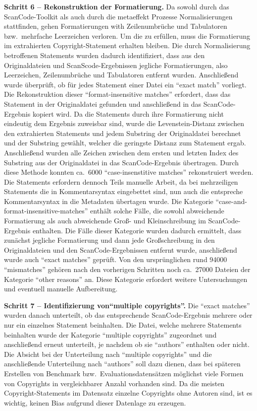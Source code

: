 \textbf{Schritt 6 -- Rekonstruktion der Formatierung.}
Da sowohl durch das ScanCode-Toolkit als auch durch die metaeffekt Prozesse Normalisierungen stattfinden, gehen Formatierungen with Zeilenumbrüche und Tabulatoren bzw.\ mehrfache Leerzeichen verloren.
Um die  zu erfüllen, muss die Formatierung im extrahierten Copyright-Statement erhalten bleiben.
Die durch Normalisierung betroffenen Statements wurden dadurch identifiziert, dass aus den Originaldateien und ScanScode-Ergebnissen jegliche Formatierungen, also Leerzeichen, Zeilenumbrüche und Tabulatoren entfernt wurden.
Anschließend wurde überprüft, ob für jedes Statement einer Datei ein \enquote{exact match} vorliegt.
Die Rekonstruktion dieser \enquote{format-insensitive matches} erfordert, dass das Statement in der Originaldatei gefunden und anschließend in das ScanCode-Ergebnis kopiert wird.
Da die Statements durch ihre Formatierung nicht eindeutig dem Ergebnis zuweisbar sind, wurde die Levenstein-Distanz zwischen den extrahierten Statements und jedem Substring der Originaldatei berechnet und der Substring gewählt, welcher die geringste Distanz zum Statement ergab.
Anschließend wurden alle Zeichen zwischen dem ersten und letzten Index des Substring aus der Originaldatei in das ScanCode-Ergebnis übertragen.
Durch diese Methode konnten ca.\ \num{6000} \enquote{case-insenstitive matches} rekonstruiert werden.
Die Statements erfordern dennoch Teils manuelle Arbeit, da bei mehrzeiligen Statements die in Kommentarsyntax eingebettet sind, nun auch die entspreche Kommentarsyntax in die Metadaten übertagen wurde.
Die Kategorie \enquote{case-and-format-insensitive-matches} enthält solche Fälle, die sowohl abweichende Formatierung als auch abweichende Groß- und Kleinschreibung im ScanCode-Ergebnis enthalten.
Die Fälle dieser Kategorie wurden dadurch ermittelt, dass zunächst jegliche Formatierung und dann jede Großschreibung in den Originaldateien und den ScanCode-Ergebnissen entfernt wurde, anschließend wurde auch \enquote{exact matches} geprüft.
Von den ursprünglichen rund \num{94000} \enquote{mismatches} gehören nach den vorherigen Schritten noch ca.\ \num{27000} Dateien der Kategorie \enquote{other reasons} an.
Diese Kategorie erfordert weitere Untersuchungen und eventuell manuelle Aufbereitung.

\textbf{Schritt 7 -- Identifizierung von\enquote{multiple copyrights}.}
Die \enquote{exact matches} wurden danach unterteilt, ob das entsprechende ScanCode-Ergebnis mehrere oder nur ein einzelnes Statement beinhalten.
Die Datei, welche mehrere Statements beinhalten wurde der Kategorie \enquote{multiple copyrights} zugeordnet und anschließend erneut unterteilt, je nachdem ob sie \enquote{authors} enthalten oder nicht.
Die Absicht bei der Unterteilung nach \enquote{multiple copyrights} und die anschließende Unterteilung nach \enquote{authors} soll dazu dienen, dass bei späteren Erstellen von Benchmark bzw.\ Evaluationsdatensätzen möglichst viele Formen von Copyrights in vergleichbarer Anzahl vorhanden sind.
Da die meisten Copyright-Statements im Datensatz einzelne Copyrights ohne Autoren sind, ist es wichtig, keinen Bias aufgrund dieser Datenlage zu erzeugen.

